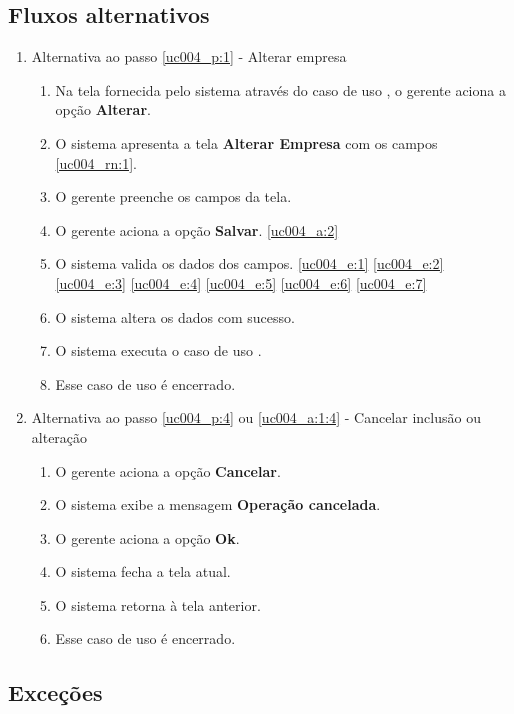 \subsection{Fluxos alternativos}

\begin{enumerate}[label=A\arabic*]
	\item Alternativa ao passo \ref{uc004_p:1} - Alterar empresa \label{uc004_a:1}
	\begin{enumerate}[label*=.\arabic*]
		\item Na tela fornecida pelo sistema através do caso de uso , o gerente aciona a opção \textbf{Alterar}. 
		\item O sistema apresenta a tela \textbf{Alterar Empresa} com os campos \ref{uc004_rn:1}. \label{uc004_a:1:2}
		\item O gerente preenche os campos da tela. \label{uc004_a:1:3}
		\item O gerente aciona a opção \textbf{Salvar}. \label{uc004_a:1:4}\ref{uc004_a:2}
		\item O sistema valida os dados dos campos. \ref{uc004_e:1} \ref{uc004_e:2} \ref{uc004_e:3} \ref{uc004_e:4} \ref{uc004_e:5} \ref{uc004_e:6} \ref{uc004_e:7}
		\item O sistema altera os dados com sucesso.
		\item O sistema executa o caso de uso .
		\item Esse caso de uso é encerrado.
	\end{enumerate}
	
	\item Alternativa ao passo \ref{uc004_p:4} ou \ref{uc004_a:1:4} - Cancelar inclusão ou alteração \label{uc004_a:2}
	\begin{enumerate}[label*=.\arabic*]
		\item O gerente aciona a opção \textbf{Cancelar}.
		\item O sistema exibe a mensagem \textbf{Operação cancelada}.
		\item O gerente aciona a opção \textbf{Ok}.
		\item O sistema fecha a tela atual.
		\item O sistema retorna à tela anterior.
		\item Esse caso de uso é encerrado.
	\end{enumerate}	 	
\end{enumerate}

\subsection{Exceções}

